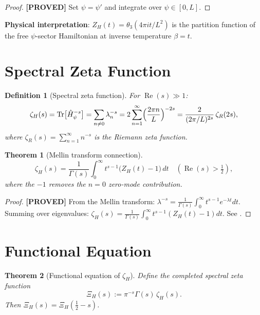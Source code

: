 \documentclass[11pt,a4paper]{article}
\newtheorem{theorem}{Theorem}
\newtheorem{definition}{Definition}
\newcommand{\proved}[1]{\textbf{[PROVED]} #1}
\begin{document}
\begin{proof}
  \proved{} Set $\psi = \psi'$ and integrate over $\psi \in [0,L]$.
\end{proof}

\textbf{Physical interpretation}: $Z_H(t) = \theta_3(4\pi it/L^2)$ is the
partition function of the free $\psi$-sector Hamiltonian at inverse
temperature $\beta = t$.

\section{Spectral Zeta Function}

\begin{definition}[Spectral zeta function]
  For $\operatorname{Re}(s) \gg 1$:
  \[
    \zeta_H(s) = \operatorname{Tr}\bigl[\hat{H}_\psi^{-s}\bigr]
    = \sum_{n\neq 0} \lambda_n^{-s}
    = 2\sum_{n=1}^\infty \Bigl(\frac{2\pi n}{L}\Bigr)^{-2s}
    = \frac{2}{(2\pi/L)^{2s}}\,\zeta_R(2s),
  \]
  where $\zeta_R(s) = \sum_{n=1}^\infty n^{-s}$ is the Riemann zeta function.
\end{definition}

\begin{theorem}[Mellin transform connection]
  \label{thm:mellin}
  \[
    \zeta_H(s) = \frac{1}{\Gamma(s)}\int_0^\infty t^{s-1}
    \bigl(Z_H(t) - 1\bigr)\, dt
    \quad (\operatorname{Re}(s) > \tfrac12),
  \]
  where the $-1$ removes the $n = 0$ zero-mode contribution.
\end{theorem}

\begin{proof}
  \proved{} From the Mellin transform:
  $\lambda^{-s} = \frac{1}{\Gamma(s)}\int_0^\infty t^{s-1}e^{-\lambda t}dt$.
  Summing over eigenvalues:
  $\zeta_H(s) = \frac{1}{\Gamma(s)}\int_0^\infty t^{s-1}(Z_H(t)-1)dt$.
  See \cite[Ch.\ 12]{Berger}.
\end{proof}

\section{Functional Equation}

\begin{theorem}[Functional equation of $\zeta_H$]
  \label{thm:funceq}
  Define the completed spectral zeta function
  \[
    \Xi_H(s) := \pi^{-s}\Gamma(s)\,\zeta_H(s).
  \]
  Then $\Xi_H(s) = \Xi_H(\tfrac12 - s)$.
\end{theorem}
\end{document}
